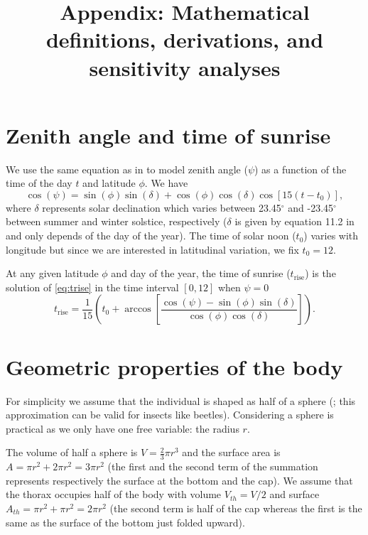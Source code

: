 \documentclass[11pt]{article}
\title{Appendix: Mathematical definitions, derivations, and sensitivity analyses}
\date{\vspace{-5ex}}
\begin{document}
\maketitle

\section{Zenith angle and time of sunrise}

We use the same equation as in \citet{Campbell2012} to model zenith angle ($\psi$) as a function of the time of the day $t$ and latitude $\phi$.
We have
\begin{equation}  \label{eq:psi}
\cos(\psi) = \sin(\phi) \sin(\delta) + \cos(\phi) \cos(\delta) \cos[15 (t- t_0)],
\end{equation}
where $\delta$ represents solar declination which varies between 23.45$^\circ$ and  -23.45$^\circ$ between summer and winter solstice, respectively ($\delta$ is given by equation 11.2 in \citet{Campbell2012} and only depends of the day of the year).
The time of solar noon ($t_0$) varies with longitude but since we are interested in latitudinal variation, we fix $t_0 = 12$.

At any given latitude $\phi$ and day of the year, the time of sunrise ($t_\text{rise}$) is the solution of \cref{eq:trise} in the time interval $[0,12]$ when $\psi = 0$
%
\begin{equation} \label{eq:trise}
t_\text{rise} =  \frac{1}{15} \left( t_0 +  \arccos \left[ \frac{\cos(\psi) - \sin(\phi) \sin(\delta)}{\cos(\phi) \cos(\delta)} \right] \right).
\end{equation}

\section{Geometric properties of the body}

For simplicity we assume that the individual is shaped as half of a sphere (; this approximation can be valid for insects like beetles).
Considering a sphere is practical as we only have one free variable: the radius $r$.

The volume of half a sphere is $V = \frac{2}{3} \pi r^3$ and the surface area is $A = \pi r^2 + 2 \pi r^ 2 = 3 \pi r^2$ (the first and the second term of the summation represents  respectively the surface at the bottom and the cap).
We assume that the thorax occupies half of the body with volume $V_{th} = V/2$ and surface $A_{th} = \pi r^2 + \pi r^2 = 2 \pi r^2$ (the second term is half of the cap whereas the first is the same as the surface of the bottom just folded upward).
\end{document}
